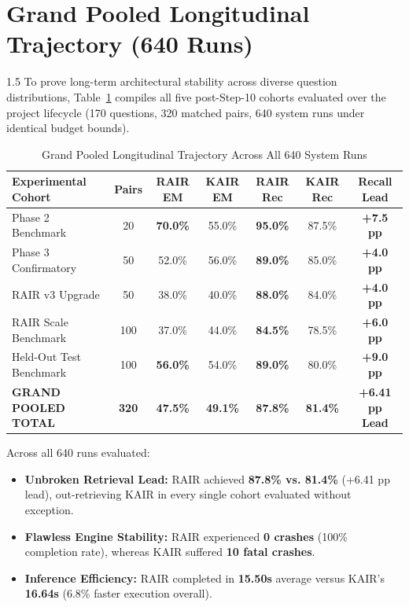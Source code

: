 \documentclass[12pt,a4paper]{report}
\begin{document}
\section{Grand Pooled Longitudinal Trajectory (640 Runs)}
\begin{spacing}{1.5}
To prove long-term architectural stability across diverse question distributions, Table~\ref{tab:grand_pooled} compiles all five post-Step-10 cohorts evaluated over the project lifecycle (170 questions, 320 matched pairs, 640 system runs under identical budget bounds).

\begin{table}[!htbp]
\centering
\small
\begin{tabular}{|l|c|c|c|c|c|c|}
\hline
\textbf{Experimental Cohort} & \textbf{Pairs} & \textbf{RAIR EM} & \textbf{KAIR EM} & \textbf{RAIR Rec} & \textbf{KAIR Rec} & \textbf{Recall Lead} \\
\hline
Phase 2 Benchmark & 20 & \textbf{70.0\%} & 55.0\% & \textbf{95.0\%} & 87.5\% & \textbf{+7.5 pp} \\
\hline
Phase 3 Confirmatory & 50 & 52.0\% & 56.0\% & \textbf{89.0\%} & 85.0\% & \textbf{+4.0 pp} \\
\hline
RAIR v3 Upgrade & 50 & 38.0\% & 40.0\% & \textbf{88.0\%} & 84.0\% & \textbf{+4.0 pp} \\
\hline
RAIR Scale Benchmark & 100 & 37.0\% & 44.0\% & \textbf{84.5\%} & 78.5\% & \textbf{+6.0 pp} \\
\hline
Held-Out Test Benchmark & 100 & \textbf{56.0\%} & 54.0\% & \textbf{89.0\%} & 80.0\% & \textbf{+9.0 pp} \\
\hline
\hline
\textbf{GRAND POOLED TOTAL} & \textbf{320} & \textbf{47.5\%} & \textbf{49.1\%} & \textbf{87.8\%} & \textbf{81.4\%} & \textbf{+6.41 pp Lead} \\
\hline
\end{tabular}
\caption{Grand Pooled Longitudinal Trajectory Across All 640 System Runs}
\label{tab:grand_pooled}
\end{table}

Across all 640 runs evaluated:
\begin{itemize}
    \item \textbf{Unbroken Retrieval Lead:} RAIR achieved \textbf{87.8\% vs. 81.4\%} (+6.41 pp lead), out-retrieving KAIR in every single cohort evaluated without exception.
    \item \textbf{Flawless Engine Stability:} RAIR experienced \textbf{0 crashes} (100\% completion rate), whereas KAIR suffered \textbf{10 fatal crashes}.
    \item \textbf{Inference Efficiency:} RAIR completed in \textbf{15.50s} average versus KAIR's \textbf{16.64s} (6.8\% faster execution overall).
\end{itemize}
\end{spacing}
\end{document}
